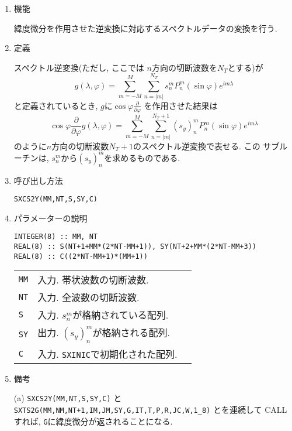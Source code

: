 \documentclass[a4j]{jsarticle}
\begin{document}
\begin{enumerate}

\item 機能 

緯度微分を作用させた逆変換に対応するスペクトルデータの変換を行う.

\item 定義

  スペクトル逆変換(ただし, ここでは $n$方向の切断波数を$N_T$とする)が
\begin{equation}
g(\lambda,\varphi)=\sum^M_{m=-M}\sum^{N_T}_{n=|m|}
s^m_nP^m_n(\sin\varphi)e^{im\lambda}
\end{equation}
と定義されているとき, $g$に$\cos\varphi\frac{\partial}{\partial\varphi}$
を作用させた結果は
\begin{equation}
\cos\varphi\frac{\partial}{\partial\varphi}
g(\lambda,\varphi)=\sum^M_{m=-M}\sum^{N_T+1}_{n=|m|}
(s_y)^m_nP^m_n(\sin\varphi)e^{im\lambda}
\end{equation}
のように$n$方向の切断波数$N_T+1$のスペクトル逆変換で表せる. この
サブルーチンは, $s^m_n$から$(s_y)^m_n$を求めるものである.

\item 呼び出し方法 

\texttt{SXCS2Y(MM,NT,S,SY,C)}
  
\item パラメーターの説明

\begin{verbatim}
INTEGER(8) :: MM, NT
REAL(8) :: S(NT+1+MM*(2*NT-MM+1)), SY(NT+2+MM*(2*NT-MM+3))  
REAL(8) :: C((2*NT-MM+1)*(MM+1))
\end{verbatim}

\begin{tabular}{lll}
\texttt{MM} & 入力. 帯状波数の切断波数.\\    
\texttt{NT} & 入力. 全波数の切断波数.\\
\texttt{S} & 入力. $s^m_n$が格納されている配列.\\
\texttt{SY} & 出力. $(s_y)^m_n$が格納される配列.\\
\texttt{C} & 入力. \texttt{SXINIC}で初期化された配列.
\end{tabular}

\item 備考

(a) \texttt{SXCS2Y(MM,NT,S,SY,C)} と 
    \texttt{SXTS2G(MM,NM,NT+1,IM,JM,SY,G,IT,T,P,R,JC,W,1\_8)}
    とを連続して CALL すれば, \texttt{G}に緯度微分が返されることになる.
    
\end{enumerate}
\end{document}
